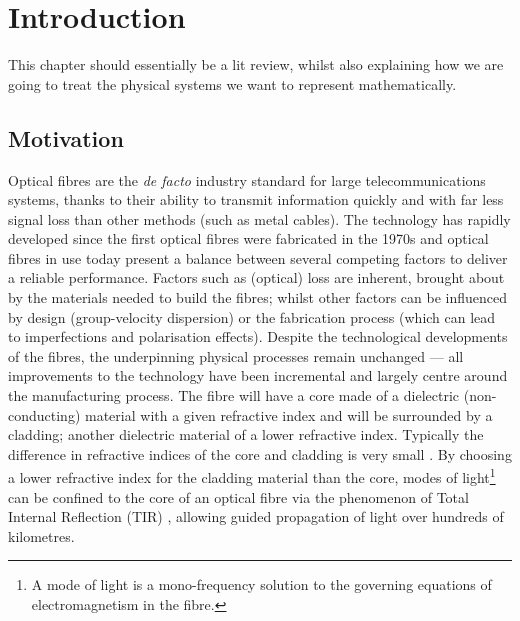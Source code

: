 \chapter{Introduction} \label{ch:Intro}
This chapter should essentially be a lit review, whilst also explaining how we are going to treat the physical systems we want to represent mathematically.

\section{Motivation} \label{sec:ProjectMotivation}
Optical fibres are the \textit{de facto} industry standard for large telecommunications systems, thanks to their ability to transmit information quickly and with far less signal loss than other methods (such as metal cables).
The technology has rapidly developed since the first optical fibres were fabricated in the 1970s \cite{knight2003photonic} and optical fibres in use today present a balance between several competing factors to deliver a reliable performance.
Factors such as (optical) loss are inherent, brought about by the materials needed to build the fibres; whilst other factors can be influenced by design (group-velocity dispersion) or the fabrication process (which can lead to imperfections and polarisation effects).
Despite the technological developments of the fibres, the underpinning physical processes remain unchanged --- all improvements to the technology have been incremental and largely centre around the manufacturing process.
The fibre will have a core made of a dielectric (non-conducting) material with a given refractive index and will be surrounded by a cladding; another dielectric material of a lower refractive index.
Typically the difference in refractive indices of the core and cladding is very small . 
By choosing a lower refractive index for the cladding material than the core, modes of light\footnote{A mode of light is a mono-frequency solution to the governing equations of electromagnetism in the fibre.} can be confined to the core of an optical fibre via the phenomenon of Total Internal Reflection (TIR) , allowing guided propagation of light over  hundreds of kilometres.\newline

